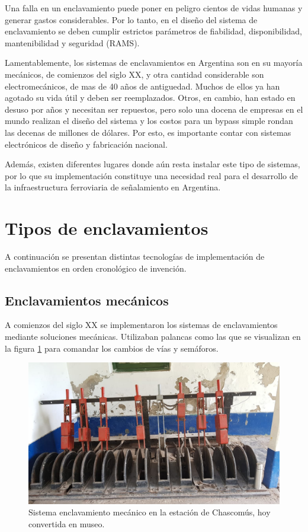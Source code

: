 	 	Una falla en un enclavamiento puede poner en peligro cientos de vidas humanas y generar gastos considerables. Por lo tanto, en el diseño del sistema de enclavamiento se deben cumplir estrictos parámetros de fiabilidad, disponibilidad, mantenibilidad y seguridad (RAMS).
	 	
	 	Lamentablemente, los sistemas de enclavamientos en Argentina son en su mayoría mecánicos, de comienzos del siglo XX, y otra cantidad considerable son electromecánicos, de mas de 40 años de antiguedad. Muchos de ellos ya han agotado su vida útil y deben ser reemplazados. Otros, en cambio, han estado en desuso por años y necesitan ser repuestos, pero solo una docena de empresas en el mundo realizan el diseño del sistema y los costos para un bypass simple rondan las decenas de millones de dólares. Por esto, es importante contar con sistemas electrónicos de diseño y fabricación nacional.

		Además, existen diferentes lugares donde aún resta instalar este tipo de sistemas, por lo que su implementación constituye una necesidad real para el desarrollo de la infraestructura ferroviaria de señalamiento en Argentina.		
	
	\section{Tipos de enclavamientos}
		
		A continuación se presentan distintas tecnologías de implementación de enclavamientos en orden cronológico de invención.
		
		\subsection{Enclavamientos mecánicos}
			
			A comienzos del siglo XX se implementaron los sistemas de enclavamientos mediante soluciones mecánicas. Utilizaban palancas como las que se visualizan en la figura \ref{fig:Mecanico} para comandar los cambios de vías y semáforos.
	
			\begin{figure}[htbp!]
				\centering
				\includegraphics[scale=.27]{./Figures/Mecanico}
				\caption{Sistema enclavamiento mecánico en la estación de Chascomús, hoy convertida en museo.}
				\label{fig:Mecanico}
			\end{figure}

